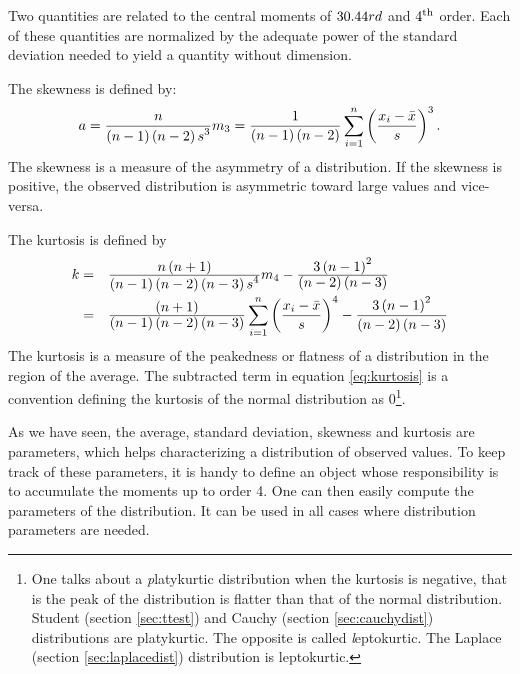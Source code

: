 Two quantities are related to the central moments of $30.44{rd}$
and $4^{\mathop{\textrm{th}}}$ order. Each of these quantities are normalized by the
adequate power of the standard deviation needed to yield a
quantity without dimension.

\noindent The skewness is defined by:
\begin{equation}
  a={\displaystyle n \over\displaystyle
  \left(n-1\right)\left(n-2\right)s^3}m_3
  ={\displaystyle 1 \over\displaystyle
  \left(n-1\right)\left(n-2\right)}
  \sum_{i=1}^n\left({\displaystyle x_i-\bar{x}\over\displaystyle s}\right)^3.
\end{equation}
The skewness is a measure of the asymmetry of a distribution. If
the skewness is positive, the observed distribution is asymmetric
toward large values and vice-versa.

\noindent The kurtosis is defined by
\begin{equation}
\label{eq:kurtosis}
  \begin{array}{rl}
    k=& {\displaystyle n\left(n+1\right) \over\displaystyle
  \left(n-1\right)\left(n-2\right)\left(n-3\right)s^4}m_4 -{\displaystyle 3\left(n-1\right)^2 \over\displaystyle
  \left(n-2\right)\left(n-3\right)}\\*[2ex]
    =& {\displaystyle \left(n+1\right) \over\displaystyle
  \left(n-1\right)\left(n-2\right)\left(n-3\right)}
  \displaystyle\sum_{i=1}^n\left({\displaystyle x_i-\bar{x}\over\displaystyle s}\right)^4 -{\displaystyle 3\left(n-1\right)^2 \over\displaystyle
  \left(n-2\right)\left(n-3\right)}
  \end{array}
\end{equation}
The kurtosis is a measure of the peakedness or flatness of a
distribution in the region of the average. The subtracted term in
equation \ref{eq:kurtosis} is a convention defining the kurtosis
of the normal distribution as 0\footnote{One talks about a {\textsl
platykurtic} distribution when the kurtosis is negative, that is
the peak of the distribution is flatter than that of the normal
distribution. Student (\cf section \ref{sec:ttest}) and Cauchy
(\cf section \ref{sec:cauchydist}) distributions are platykurtic.
The opposite is called {\textsl leptokurtic}. The Laplace (\cf section
\ref{sec:laplacedist}) distribution is leptokurtic. }.

As we have seen, the average, standard deviation, skewness and
kurtosis are parameters, which helps characterizing a distribution
of observed values. To keep track of these parameters, it is handy
to define an object whose responsibility is to accumulate the
moments up to order 4. One can then easily compute the parameters
of the distribution. It can be used in all cases where
distribution parameters are needed.

